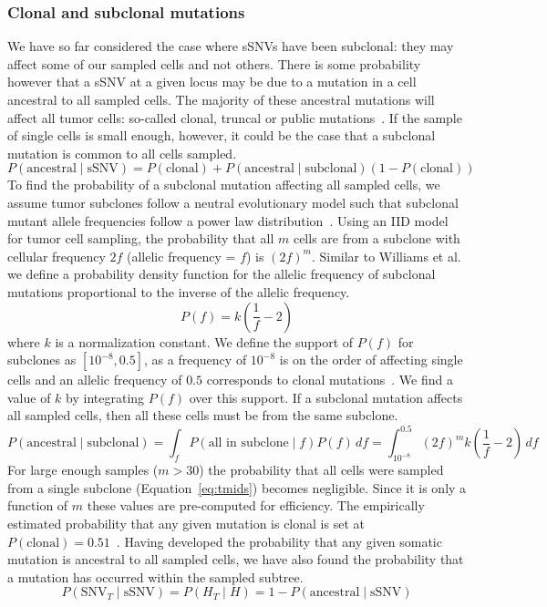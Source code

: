 \documentclass[../../main.tex]{subfiles}
\begin{document}
\subsubsection*{Clonal and subclonal mutations}
We have so far considered the case where sSNVs have been subclonal: they may affect some of our sampled cells and not others.
There is some probability however that a sSNV at a given locus may be due to a mutation in a cell ancestral to all sampled cells.
The majority of these ancestral mutations will affect all tumor cells: so-called clonal, truncal or public mutations~\cite{neutralevoltumour, 21breasts, metastatic}.
If the sample of single cells is small enough, however, it could be the case that a subclonal mutation is common to all cells sampled.
\begin{equation}
P(\text{ancestral}\mid \text{sSNV})=P(\text{clonal})+P(\text{ancestral}\mid \text{subclonal})(1-P(\text{clonal}))
\end{equation}
To find the probability of a subclonal mutation affecting all sampled cells, we assume tumor subclones follow a neutral evolutionary model such that subclonal mutant allele frequencies follow a power law distribution~\cite{neutralevoltumour}.
Using an IID model for tumor cell sampling, the probability that all $m$ cells are from a subclone with cellular frequency $2f$ (allelic frequency = $f$) is $(2f)^m$.
Similar to Williams et al.
we define a probability density function for the allelic frequency of subclonal mutations proportional to the inverse of the allelic frequency.\\
\begin{equation}
P(f) = k\left(\frac{1}{f}-2\right)
\end{equation}
where $k$ is a normalization constant.
We define the support of $P(f)$ for subclones as $[10^{-8},0.5]$, as a frequency of $10^{-8}$ is on the order of affecting single cells and an allelic frequency of $0.5$ corresponds to clonal mutations~\cite{numcells}.
We find a value of $k$ by integrating $P(f)$ over this support.
If a subclonal mutation affects all sampled cells, then all these cells must be from the same subclone.
\begin{equation} \label{eq:tmids}
P(\text{ancestral}\mid \text{subclonal}) = \int_f P(\text{all in subclone}\mid f)P(f)\,df=\int_{10^{-8}}^{0.5}(2f)^mk\left(\frac{1}{f}-2\right)\,df
\end{equation}
For large enough samples ($m>30$) the probability that all cells were sampled from a single subclone (Equation~\ref{eq:tmids}) becomes negligible.
Since it is only a function of $m$ these values are pre-computed for efficiency.
The empirically estimated probability that any given mutation is clonal is set at $P(\text{clonal})=0.51$~\cite{21breasts, metastatic, yachida}.
Having developed the probability that any given somatic mutation is ancestral to all sampled cells, we have also found the probability that a mutation has occurred within the sampled subtree.
\begin{equation*}
P(\text{SNV}_T\mid\text{sSNV})=P(H_T\mid H)=1-P(\text{ancestral}\mid\text{sSNV})
\end{equation*}
\end{document}
